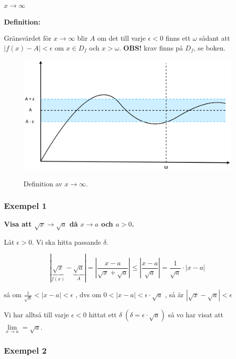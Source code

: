 \documentclass[swedish]{article}
\begin{document}
{\large\underline{$x \to \infty$}}

\smallbreak

\textbf{Definition:}

Gränsvärdet för $x \to \infty$ blir $A$ om det till varje $\epsilon < 0$ finns ett $\omega$ sådant att $|f(x) - A| < \epsilon$ om $x \in D_f$ och $x > \omega$. \textbf{OBS!} krav finns på $D_f$, se boken. 

\begin{figure}[h!]
    \includegraphics[width=14cm]{figur3.png}
    \label{fig:figur3}
    \caption{Definition av $x \to \infty$.}
\end{figure}

\subsubsection{Exempel 1}

\textbf{Visa att $\sqrt{x} \to \sqrt{a}$ då $x \to a$ och $a > 0$.}

Låt $\epsilon > 0$. Vi ska hitta passande $\delta$.

\[|\underbrace{\sqrt{x}}_{f(x)} - \underbrace{\sqrt{a}}_A| = \left|\frac{x-a}{\sqrt{x}+\sqrt{a}}\right| \leq \left|\frac{x-a}{\sqrt{a}}\right| = \frac{1}{\sqrt{a}} \cdot \left| x - a \right|\]

\bigbreak

så om $\frac{1}{\sqrt{a}} < |x-a| < \epsilon$ , dvs om $0 < |x-a| < \epsilon \cdot \sqrt{a}$ , så är $|\sqrt{x} - \sqrt{a} | < \epsilon$

\bigbreak

Vi har alltså till varje $\epsilon < 0$ hittat ett $\delta \; (\delta = \epsilon \cdot \sqrt{a})$ så vo har visat att $\lim\limits_{x \to a} = \sqrt{a}$.

\subsubsection{Exempel 2}
\end{document}
